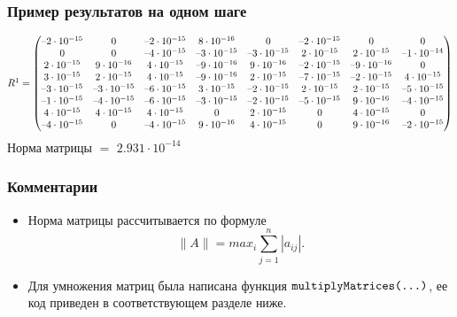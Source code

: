 \documentclass[a4paper,11pt]{article}
\begin{document}
\subsubsection{Пример результатов на одном шаге}

  \small
  \[R \footnotemark = \begin{pmatrix}
    \text{--}2 \cdot 10^{-15} & 0 & \text{--}2 \cdot 10^{-15} & 8 \cdot 10^{-16} &
          0 & \text{--}2 \cdot 10^{-15} & 0 & 0 \\
    0 & 0 & \text{--}4 \cdot 10^{-15} & \text{--}3 \cdot 10^{-15} & \text{--}3 \cdot 10^{-15} &
          2 \cdot 10^{-15} & 2 \cdot 10^{-15} & \text{--}1 \cdot 10^{-14} \\
    2 \cdot 10^{-15} & 9 \cdot 10^{-16} & 4 \cdot 10^{-15} & \text{--}9 \cdot 10^{-16} &
          9 \cdot 10^{-16} & \text{--}2 \cdot 10^{-15} & \text{--}9 \cdot 10^{-16} & 0 \\
    3 \cdot 10^{-15} & 2 \cdot 10^{-15} & 4 \cdot 10^{-15} & \text{--}9 \cdot 10^{-16} &
          2 \cdot 10^{-15} & \text{--}7 \cdot 10^{-15} & \text{--}2 \cdot 10^{-15} & 4 \cdot 10^{-15} \\
    \text{--}3 \cdot 10^{-15} & \text{--}3 \cdot 10^{-15} & \text{--}6 \cdot 10^{-15} & 3 \cdot 10^{-15} &
          \text{--}2 \cdot 10^{-15} & 2 \cdot 10^{-15} & 2 \cdot 10^{-15} & \text{--}5 \cdot 10^{-15} \\
    \text{--}1 \cdot 10^{-15} & \text{--}4 \cdot 10^{-15} & \text{--}6 \cdot 10^{-15} & \text{--}3 \cdot 10^{-15} &
          \text{--}2 \cdot 10^{-15} & \text{--}5 \cdot 10^{-15} & 9 \cdot 10^{-16} & \text{--}4 \cdot 10^{-15} \\
    4 \cdot 10^{-15} & 4 \cdot 10^{-15} & 4 \cdot 10^{-15} & 0 & 2 \cdot 10^{-15} & 0 & 4 \cdot 10^{-15} & 0 \\
    \text{--}4 \cdot 10^{-15} & 0 & \text{--}4 \cdot 10^{-15} & 9 \cdot 10^{-16} &
          4 \cdot 10^{-15} & 0 & 9 \cdot 10^{-16} & \text{--}2 \cdot 10^{-15} \\
  \end{pmatrix} \]
\normalsize
Норма матрицы $=$ $2.931 \cdot 10^{-14}$
\subsubsection{Комментарии}
\begin{itemize}
  \item Норма матрицы рассчитывается по формуле \[\parallel A \parallel = max_i \sum_{j=1}^n |a_{ij}|.\]
  \item Для умножения матриц была написана функция $\verb|multiplyMatrices(...)|$, ее код приведен в соответствующем разделе ниже.
\end{itemize}
\end{document}
